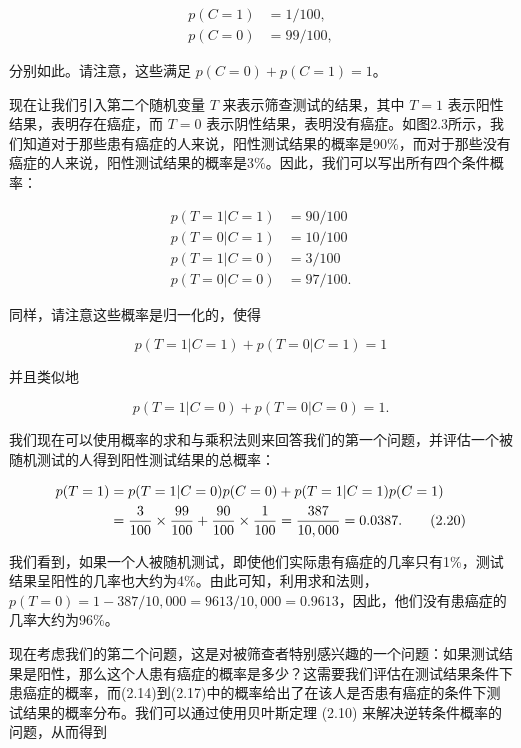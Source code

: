 \documentclass{article}
\begin{document}
\begin{align}
p(C=1) &= 1/100, \tag{2.12} \\
p(C=0) &= 99/100, \tag{2.13}
\end{align}

分别如此。请注意，这些满足 $p(C=0)+p(C=1)=1$。

现在让我们引入第二个随机变量 $T$ 来表示筛查测试的结果，其中 $T = 1$ 表示阳性结果，表明存在癌症，而 $T = 0$ 表示阴性结果，表明没有癌症。如图2.3所示，我们知道对于那些患有癌症的人来说，阳性测试结果的概率是90\%，而对于那些没有癌症的人来说，阳性测试结果的概率是3\%。因此，我们可以写出所有四个条件概率：

\begin{align}
p(T=1|C=1) &= 90/100 \tag{2.14} \\
p(T=0|C=1) &= 10/100 \tag{2.15} \\
p(T=1|C=0) &= 3/100 \tag{2.16} \\
p(T=0|C=0) &= 97/100. \tag{2.17}
\end{align}

同样，请注意这些概率是归一化的，使得

\begin{equation}
p(T=1|C=1)+p(T=0|C=1)=1 \tag{2.18}
\end{equation}

并且类似地

\begin{equation}
p(T=1|C=0)+p(T=0|C=0)=1. \tag{2.19}
\end{equation}

我们现在可以使用概率的求和与乘积法则来回答我们的第一个问题，并评估一个被随机测试的人得到阳性测试结果的总概率：

\begin{align}
p(T=1) &= p(T=1|C=0)p(C=0)+p(T=1|C=1)p(C=1) \notag \\
&= \frac{3}{100}\times\frac{99}{100}+\frac{90}{100}\times\frac{1}{100}=\frac{387}{10,000}=0.0387. \tag{2.20}
\end{align}

我们看到，如果一个人被随机测试，即使他们实际患有癌症的几率只有1\%，测试结果呈阳性的几率也大约为4\%。由此可知，利用求和法则，$p(T=0)=1-387/10,000=9613/10,000=0.9613$，因此，他们没有患癌症的几率大约为96\%。

现在考虑我们的第二个问题，这是对被筛查者特别感兴趣的一个问题：如果测试结果是阳性，那么这个人患有癌症的概率是多少？这需要我们评估在测试结果条件下患癌症的概率，而(2.14)到(2.17)中的概率给出了在该人是否患有癌症的条件下测试结果的概率分布。我们可以通过使用贝叶斯定理 (2.10) 来解决逆转条件概率的问题，从而得到
\end{document}
